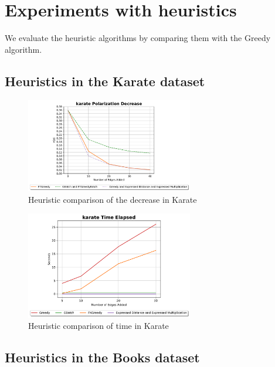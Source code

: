 \section{Experiments with heuristics}
\label{sec:experimHeuristics}

 We evaluate the heuristic algorithms by comparing them with the Greedy  algorithm. 

 \clearpage

\subsection{Heuristics in the Karate dataset}

\begin{figure}[!htbp]
	\centering
	\includegraphics[width=0.65\textwidth]{Figures/Karate Polarization Decrease}
	\caption{Heuristic comparison of the decrease in Karate}
	\label{fig:karate_pol}
\end{figure}


\begin{figure}[!htbp]
	\centering
	\includegraphics[width=0.65\textwidth]{Figures/Karate Time Elapsed}
	\caption{Heuristic comparison of time in Karate}
	\label{fig:karate_time}
\end{figure}

\clearpage

\subsection{Heuristics in the Books dataset}

